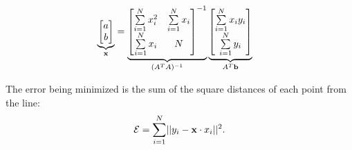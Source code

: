 \begin{problem}
\begin{enumroman}
\begin{answer}
        \begin{align*}
          \underbrace{\begin{bmatrix}
            a \\
            b
          \end{bmatrix}}_{\mathbf{x}}
          &=
          \underbrace{\begin{bmatrix}
            \sum\limits_{i=1}^N x_i^2 & \sum\limits_{i=1}^N x_i \\
            \sum\limits_{i=1}^N x_i & N
          \end{bmatrix}^{-1}}_{(A^T A)^{-1}}
          \underbrace{\begin{bmatrix}
            \sum\limits_{i=1}^N x_i y_i \\
            \sum\limits_{i=1}^N y_i
          \end{bmatrix}}_{A^T \mathbf{b}}
        \end{align*}

        \newpage
        The error being minimized is the sum of the square
        distances of each point from the line:
        \[ \mathcal{E} = \sum_{i=1}^N \lvert\lvert y_i - \mathbf{x} \cdot x_i\rvert\rvert^2. \]

        \begin{figure}[H]
          \centering
\end{figure}
\end{answer}
\end{enumroman}
\end{problem}

